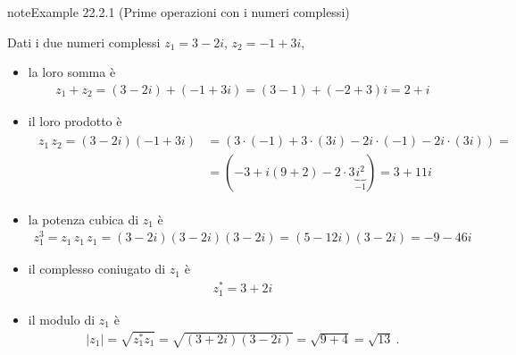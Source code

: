 \documentclass[letterpaper,10pt,italian]{jupyterBook}
\begin{document}
\begin{sphinxadmonition}{note}{Example 22.2.1 (Prime operazioni con i numeri complessi)}



\sphinxAtStartPar
Dati i due numeri complessi \(z_1 = 3 - 2 i\), \(z_2 = -1 + 3 i\),
\begin{itemize}
\item {} 
\sphinxAtStartPar
la loro somma è
\begin{equation*}
\begin{split}z_1 + z_2 = (3 - 2i) + (-1 + 3 i) = (3-1) +(-2+3)i = 2 + i\end{split}
\end{equation*}
\item {} 
\sphinxAtStartPar
il loro prodotto è
\begin{equation*}
\begin{split}\begin{aligned}
    z_1 \, z_2 = (3-2i)(-1+3i) & = ( 3 \cdot (-1) + 3 \cdot (3i) - 2i \cdot (-1) - 2i \cdot (3i) ) = \\
    & = (-3 + i ( 9 + 2 ) - 2 \cdot 3 \underbrace{i^2}_{-1} ) = 3 + 11 i
   \end{aligned}\end{split}
\end{equation*}
\item {} 
\sphinxAtStartPar
la potenza cubica di \(z_1\) è
\begin{equation*}
\begin{split}z_1^3 = z_1 \, z_1 \, z_1 = (3-2i)(3-2i)(3-2i) = (5-12 i)(3-2i) = -9 - 46 i\end{split}
\end{equation*}
\item {} 
\sphinxAtStartPar
il complesso coniugato di \(z_1\) è
\begin{equation*}
\begin{split}z_1^* = 3 + 2 i\end{split}
\end{equation*}
\item {} 
\sphinxAtStartPar
il modulo di \(z_1\) è
\begin{equation*}
\begin{split}|z_1| = \sqrt{z_1^* z_1} = \sqrt{(3+2 i)(3-2i)} = \sqrt{9+4} = \sqrt{13} \ .\end{split}
\end{equation*}
\end{itemize}
\end{sphinxadmonition}
\end{document}
